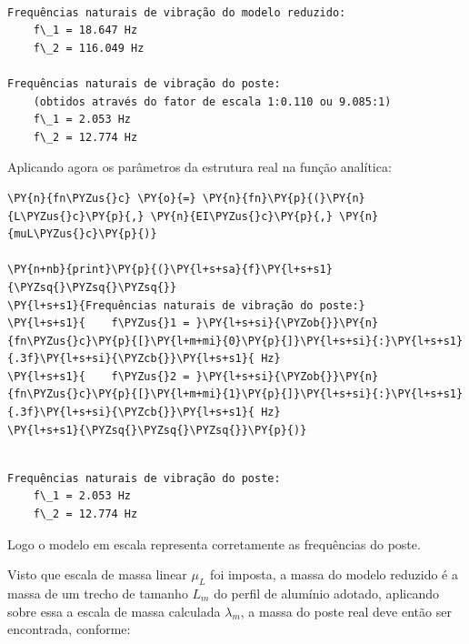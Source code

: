     \begin{Verbatim}[commandchars=\\\{\}]

Frequências naturais de vibração do modelo reduzido:
    f\_1 = 18.647 Hz
    f\_2 = 116.049 Hz

Frequências naturais de vibração do poste:
    (obtidos através do fator de escala 1:0.110 ou 9.085:1)
    f\_1 = 2.053 Hz
    f\_2 = 12.774 Hz

    \end{Verbatim}

    Aplicando agora os parâmetros da estrutura real na função analítica:

    \begin{tcolorbox}[breakable, size=fbox, boxrule=1pt, pad at break*=1mm,colback=cellbackground, colframe=cellborder]
\begin{Verbatim}[commandchars=\\\{\}]
\PY{n}{fn\PYZus{}c} \PY{o}{=} \PY{n}{fn}\PY{p}{(}\PY{n}{L\PYZus{}c}\PY{p}{,} \PY{n}{EI\PYZus{}c}\PY{p}{,} \PY{n}{muL\PYZus{}c}\PY{p}{)}

\PY{n+nb}{print}\PY{p}{(}\PY{l+s+sa}{f}\PY{l+s+s1}{\PYZsq{}\PYZsq{}\PYZsq{}}
\PY{l+s+s1}{Frequências naturais de vibração do poste:}
\PY{l+s+s1}{    f\PYZus{}1 = }\PY{l+s+si}{\PYZob{}}\PY{n}{fn\PYZus{}c}\PY{p}{[}\PY{l+m+mi}{0}\PY{p}{]}\PY{l+s+si}{:}\PY{l+s+s1}{.3f}\PY{l+s+si}{\PYZcb{}}\PY{l+s+s1}{ Hz}
\PY{l+s+s1}{    f\PYZus{}2 = }\PY{l+s+si}{\PYZob{}}\PY{n}{fn\PYZus{}c}\PY{p}{[}\PY{l+m+mi}{1}\PY{p}{]}\PY{l+s+si}{:}\PY{l+s+s1}{.3f}\PY{l+s+si}{\PYZcb{}}\PY{l+s+s1}{ Hz}
\PY{l+s+s1}{\PYZsq{}\PYZsq{}\PYZsq{}}\PY{p}{)}
\end{Verbatim}
\end{tcolorbox}

    \begin{Verbatim}[commandchars=\\\{\}]

Frequências naturais de vibração do poste:
    f\_1 = 2.053 Hz
    f\_2 = 12.774 Hz

    \end{Verbatim}

    Logo o modelo em escala representa corretamente as frequências do poste.

Visto que escala de massa linear \(\mu_L\) foi imposta, a massa do
modelo reduzido é a massa de um trecho de tamanho \(L_m\) do perfil de
alumínio adotado, aplicando sobre essa a escala de massa calculada
\(\lambda_m\), a massa do poste real deve então ser encontrada,
conforme:

